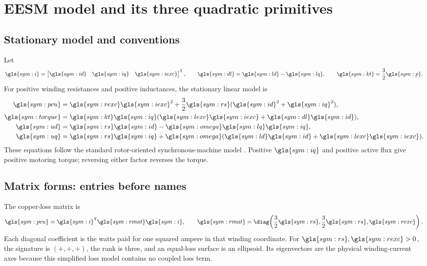 \section{EESM model and its three quadratic primitives}
\label{sec:model}

\subsection{Stationary model and conventions}

Let
\begin{equation}
 \gls{sym:i}=\begin{bmatrix}\gls{sym:id}&\gls{sym:iq}&\gls{sym:iexc}\end{bmatrix}^{\mathsf T},
 \qquad \gls{sym:dl}=\gls{sym:ld}-\gls{sym:lq},
 \qquad \gls{sym:kt}=\frac32\gls{sym:p}.
\end{equation}
For positive winding resistances and positive inductances, the stationary
linear model is
\begin{align}
 \gls{sym:pcu}&=\gls{sym:rexc}\gls{sym:iexc}^{2}
 +\frac32\gls{sym:rs}(\gls{sym:id}^{2}+\gls{sym:iq}^{2}),
 \label{eq:model-loss}\\
 \gls{sym:torque}&=\gls{sym:kt}\gls{sym:iq}
 (\gls{sym:lexc}\gls{sym:iexc}+\gls{sym:dl}\gls{sym:id}),
 \label{eq:model-torque}\\
 \gls{sym:ud}&=\gls{sym:rs}\gls{sym:id}
 -\gls{sym:omega}\gls{sym:lq}\gls{sym:iq},
 \label{eq:model-ud}\\
 \gls{sym:uq}&=\gls{sym:rs}\gls{sym:iq}
 +\gls{sym:omega}(\gls{sym:ld}\gls{sym:id}
 +\gls{sym:lexc}\gls{sym:iexc}).
 \label{eq:model-uq}
\end{align}
These equations follow the standard rotor-oriented synchronous-machine model
\cite{binder2017,schroeder2021}. Positive \(\gls{sym:iq}\) and positive
active flux give positive motoring torque; reversing either factor reverses
the torque.

\subsection{Matrix forms: entries before names}

The copper-loss matrix is
\begin{equation}
 \gls{sym:pcu}=\gls{sym:i}^{\mathsf T}\gls{sym:rmat}\gls{sym:i},\qquad
 \gls{sym:rmat}=\diag\!\left(\frac32\gls{sym:rs},
 \frac32\gls{sym:rs},\gls{sym:rexc}\right).
 \label{eq:R-matrix}
\end{equation}
Each diagonal coefficient is the watts paid for one squared ampere in that
winding coordinate. For \(\gls{sym:rs},\gls{sym:rexc}>0\), the signature is
\((+,+,+)\), the rank is three, and an equal-loss surface is an ellipsoid.
Its eigenvectors are the physical winding-current axes because this simplified
loss model contains no coupled loss term.

